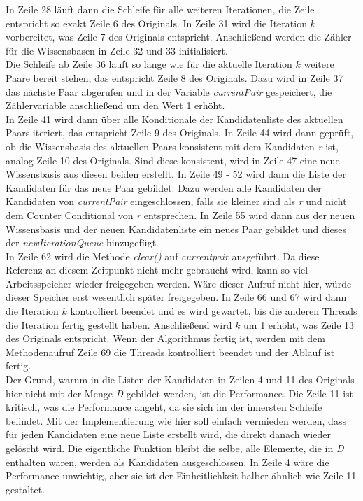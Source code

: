 \documentclass[12pt,a4paper]{article}
\begin{document}
In Zeile 28 läuft dann die Schleife für alle weiteren Iterationen, die Zeile entspricht so exakt Zeile 6 des Originals. In Zeile 31 wird die Iteration $k$ vorbereitet, was Zeile 7 des Originals entspricht. Anschließend werden die Zähler für die Wissensbasen in Zeile 32 und 33 initialisiert. \\
Die Schleife ab Zeile 36 läuft so lange wie für die aktuelle Iteration $k$ weitere Paare bereit stehen, das entspricht Zeile 8 des Originals. Dazu wird in Zeile 37 das nächste Paar abgerufen und in der Variable \textit{currentPair} gespeichert, die Zählervariable anschließend um den Wert 1 erhöht. \\
In Zeile 41 wird dann über alle Konditionale der Kandidatenliste des aktuellen Paars iteriert, das entspricht Zeile 9 des Originals. In Zeile 44 wird dann geprüft, ob die Wissensbasis des aktuellen Paars konsistent mit dem Kandidaten \textit{r} ist, analog Zeile 10 des Originals. Sind diese konsistent, wird in Zeile 47 eine neue Wissensbasis aus diesen beiden erstellt. In Zeile 49 - 52 wird dann die Liste der Kandidaten für das neue Paar gebildet. Dazu werden alle Kandidaten der Kandidaten von \textit{currentPair} eingeschlossen, falls sie kleiner sind als \textit{r} und nicht dem Counter Conditional von \textit{r} entsprechen. In Zeile 55 wird dann aus der neuen Wissensbasis und der neuen Kandidatenliste ein neues Paar gebildet und dieses der \textit{newIterationQueue} hinzugefügt. \\
In Zeile 62 wird die Methode \textit{clear()} auf \textit{currentpair} ausgeführt. Da diese Referenz  an diesem Zeitpunkt nicht mehr gebraucht wird, kann so viel Arbeitsspeicher wieder freigegeben werden. Wäre dieser Aufruf nicht hier, würde dieser Speicher erst wesentlich später freigegeben. In Zeile 66 und 67 wird dann die Iteration $k$ kontrolliert beendet und es wird gewartet, bis die anderen Threads die Iteration fertig gestellt haben. Anschließend wird $k$ um 1 erhöht, was Zeile 13 des Originals entspricht. Wenn der Algorithmus fertig ist, werden mit dem Methodenaufruf Zeile 69 die Threads kontrolliert beendet und der Ablauf ist fertig. \\
Der Grund, warum in die Listen der Kandidaten in Zeilen 4 und 11 des Originals hier nicht mit der Menge \textit{D} gebildet werden, ist die Performance. Die Zeile 11 ist kritisch, was die Performance angeht, da sie sich im der innersten Schleife befindet. Mit der Implementierung wie hier soll einfach vermieden werden, dass für jeden Kandidaten eine neue Liste erstellt wird, die direkt danach wieder gelöscht wird. Die eigentliche Funktion bleibt die selbe, alle Elemente, die in \textit{D} enthalten wären, werden als Kandidaten ausgeschlossen. In Zeile 4 wäre die Performance unwichtig, aber sie ist der Einheitlichkeit halber ähnlich wie Zeile 11 gestaltet.
\end{document}
